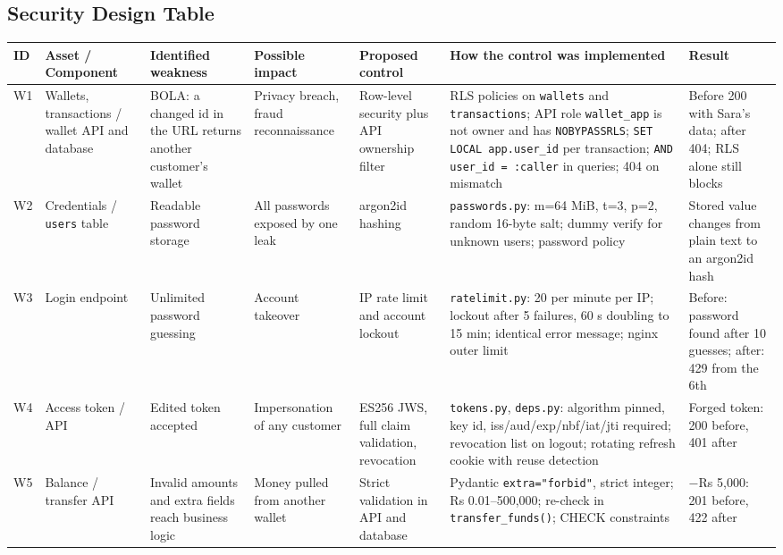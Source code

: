 \documentclass[11pt,a4paper]{article}
\newcommand{\code}[1]{\texttt{#1}}
\begin{document}
\begin{landscape}
\section{Security Design Table}
\footnotesize
\setlength{\tabcolsep}{4pt}
\begin{longtable}{P{0.7cm}P{2.6cm}P{3.3cm}P{2.6cm}P{3.4cm}P{5.2cm}P{3.3cm}}
\toprule
ID & Asset / Component & Identified weakness & Possible impact & Proposed control & How the control was implemented & Result \\
\midrule
\endhead
W1 & Wallets, transactions / wallet API and database & BOLA: a changed id in the URL returns another customer's wallet & Privacy breach, fraud reconnaissance & Row-level security plus API ownership filter & RLS policies on \code{wallets} and \code{transactions}; API role \code{wallet\_app} is not owner and has \code{NOBYPASSRLS}; \code{SET LOCAL app.user\_id} per transaction; \code{AND user\_id = :caller} in queries; 404 on mismatch & Before 200 with Sara's data; after 404; RLS alone still blocks \\
\midrule
W2 & Credentials / \code{users} table & Readable password storage & All passwords exposed by one leak & argon2id hashing & \code{passwords.py}: m=64 MiB, t=3, p=2, random 16-byte salt; dummy verify for unknown users; password policy & Stored value changes from plain text to an argon2id hash \\
\midrule
W3 & Login endpoint & Unlimited password guessing & Account takeover & IP rate limit and account lockout & \code{ratelimit.py}: 20 per minute per IP; lockout after 5 failures, 60 s doubling to 15 min; identical error message; nginx outer limit & Before: password found after 10 guesses; after: 429 from the 6th \\
\midrule
W4 & Access token / API & Edited token accepted & Impersonation of any customer & ES256 JWS, full claim validation, revocation & \code{tokens.py}, \code{deps.py}: algorithm pinned, key id, iss/aud/exp/nbf/iat/jti required; revocation list on logout; rotating refresh cookie with reuse detection & Forged token: 200 before, 401 after \\
\midrule
W5 & Balance / transfer API & Invalid amounts and extra fields reach business logic & Money pulled from another wallet & Strict validation in API and database & Pydantic \code{extra="forbid"}, strict integer; Rs 0.01--500,000; re-check in \code{transfer\_funds()}; CHECK constraints & $-$Rs 5,000: 201 before, 422 after \\

\end{longtable}
\end{landscape}
\end{document}
